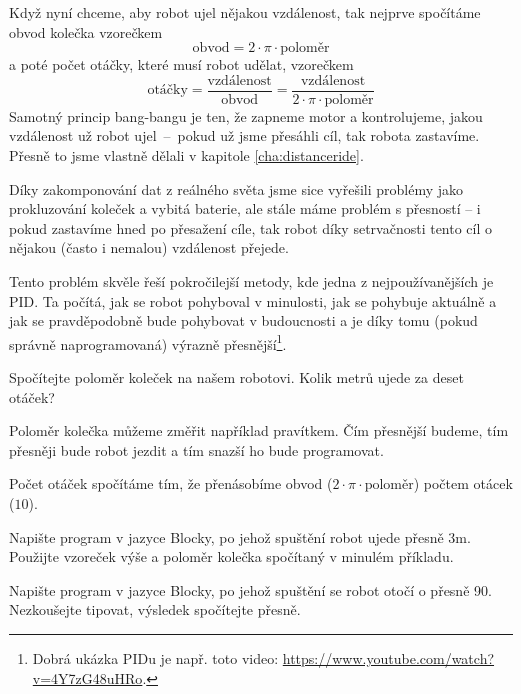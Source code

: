 \documentclass[../main.tex]{subfiles}
\begin{document}
	Když nyní chceme, aby robot ujel nějakou vzdálenost, tak nejprve spočítáme obvod kolečka vzorečkem
	$$\text{obvod} = 2 \cdot \pi \cdot \text{poloměr}$$
	a poté počet otáčky, které musí robot udělat, vzorečkem
	$$\text{otáčky} = \frac{\text{vzdálenost}}{\text{obvod}} =  \frac{\text{vzdálenost}}{2 \cdot \pi \cdot \text{poloměr}}$$ 
	Samotný princip bang-bangu je ten, že zapneme motor a kontrolujeme, jakou vzdálenost už robot ujel~--~pokud už jsme přesáhli cíl, tak robota zastavíme. Přesně to jsme vlastně dělali v kapitole \ref{cha:distanceride}.

	Díky zakomponování dat z reálného světa jsme sice vyřešili problémy jako prokluzování koleček a vybitá baterie, ale stále máme problém s přesností -- i pokud zastavíme hned po přesažení cíle, tak robot díky setrvačnosti tento cíl o nějakou (často i nemalou) vzdálenost přejede.

	Tento problém skvěle řeší pokročilejší metody, kde jedna z nejpoužívanějších je PID. Ta počítá, jak se robot pohyboval v minulosti, jak se pohybuje aktuálně a jak se pravděpodobně bude pohybovat v budoucnosti a je díky tomu (pokud správně naprogramovaná) výrazně přesnější\footnote{Dobrá ukázka PIDu je např. toto video: \href{https://www.youtube.com/watch?v=4Y7zG48uHRo}{https://www.youtube.com/watch?v=4Y7zG48uHRo}.}. 

	\begin{question}
		Spočítejte poloměr koleček na našem robotovi. Kolik metrů ujede za deset otáček?
	\end{question}

	\begin{solution}
		Poloměr kolečka můžeme změřit například pravítkem. Čím přesnější budeme, tím přesněji bude robot jezdit a tím snazší ho bude programovat.

		Počet otáček spočítáme tím, že přenásobíme obvod ($2 \cdot \pi \cdot \text{poloměr}$) počtem otácek ($10$).
	\end{solution}

	\begin{question}
		Napište program v jazyce Blocky, po jehož spuštění robot ujede přesně \si{3m}. Použijte vzoreček výše a poloměr kolečka spočítaný v minulém příkladu.
	\end{question}

	\begin{question*}
		Napište program v jazyce Blocky, po jehož spuštění se robot otočí o přesně 90\degree. Nezkoušejte tipovat, výsledek spočítejte přesně.
	\end{question*}
\end{document}
